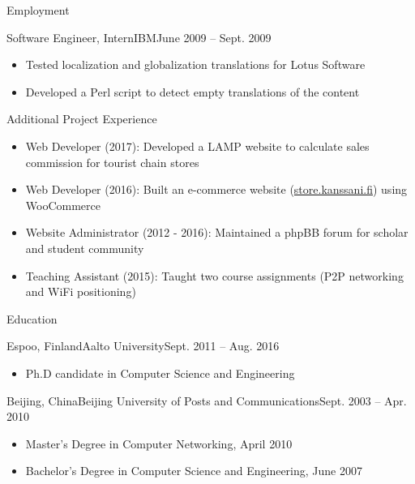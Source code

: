 \documentclass[print]{mcdowellcv}
\begin{document}
\begin{cvsection}{Employment}
		\begin{cvsubsection}{Software Engineer, Intern}{IBM}{June 2009 -- Sept. 2009}	
			\begin{itemize}
				\item Tested localization and globalization translations for Lotus Software
				\item Developed a Perl script to detect empty translations of the content
			\end{itemize}
		\end{cvsubsection}
	\end{cvsection}

	\begin{cvsection}{Additional Project Experience}
		\begin{cvsubsection}{}{}{}	
			\begin{itemize}
				\item Web Developer (2017): Developed a LAMP website to calculate sales commission for tourist chain stores
				\item Web Developer (2016): Built an e-commerce website (\url{store.kanssani.fi}) using WooCommerce
				\item Website Administrator (2012 - 2016): Maintained a phpBB forum for scholar and student community
				\item Teaching Assistant (2015): Taught two course assignments (P2P networking and WiFi positioning)
			\end{itemize}
		\end{cvsubsection}
	\end{cvsection}
	
	\begin{cvsection}{Education}
		\begin{cvsubsection}{Espoo, Finland}{Aalto University}{Sept. 2011 -- Aug. 2016}
			\begin{itemize}
				\item Ph.D candidate in Computer Science and Engineering
			\end{itemize}
		\end{cvsubsection}

		\begin{cvsubsection}[3]{Beijing, China}{Beijing University of Posts and Communications}{Sept. 2003 --  Apr. 2010}
			\begin{itemize}
				\item Master's Degree in Computer Networking, April 2010
				\item Bachelor's Degree in Computer Science and Engineering, June 2007
			\end{itemize}
		\end{cvsubsection}
	\end{cvsection}
\end{document}
